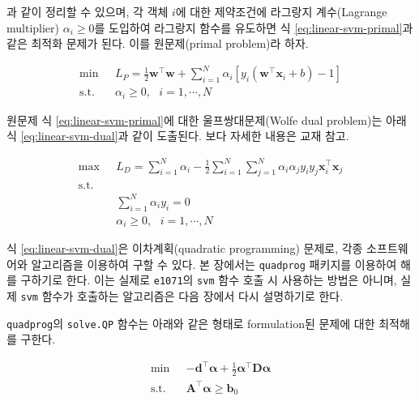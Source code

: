 \documentclass[
]{book}
\begin{document}
과 같이 정리할 수 있으며, 각 객체 \(i\)에 대한 제약조건에 라그랑지 계수(Lagrange multiplier) \(\alpha_i \ge 0\)를 도입하여 라그랑지 함수를 유도하면 식 \eqref{eq:linear-svm-primal}과 같은 최적화 문제가 된다. 이를 원문제(primal problem)라 하자.

\begin{equation}
\begin{split}
\min \text{  } & L_P = \frac{1}{2} \mathbf{w}^\top \mathbf{w} + \sum_{i = 1}^{N} \alpha_i \left[ y_i \left( \mathbf{w}^\top \mathbf{x}_i + b \right) - 1 \right]\\
\text{s.t.  } & \alpha_i \ge 0, \text{  } i = 1, \cdots, N
\end{split}
\label{eq:linear-svm-primal}
\end{equation}

원문제 식 \eqref{eq:linear-svm-primal}에 대한 울프쌍대문제(Wolfe dual problem)는 아래 식 \eqref{eq:linear-svm-dual}과 같이 도출된다. 보다 자세한 내용은 교재\citep{jun2012datamining} 참고.

\begin{equation}
\begin{split}
\max \text{  } & L_D = \sum_{i = 1}^{N} \alpha_i - \frac{1}{2} \sum_{i = 1}^{N} \sum_{j = 1}^{N} \alpha_i \alpha_j y_i y_j \mathbf{x}_i^\top \mathbf{x}_j\\
\text{s.t. } &\\
& \sum_{i = 1}^{N} \alpha_i y_i = 0\\
& \alpha_i \ge 0, \text{  } i = 1, \cdots, N
\end{split}
\label{eq:linear-svm-dual}
\end{equation}

식 \eqref{eq:linear-svm-dual}은 이차계획(quadratic programming) 문제로, 각종 소프트웨어와 알고리즘을 이용하여 구할 수 있다. 본 장에서는 \texttt{quadprog} 패키지를 이용하여 해를 구하기로 한다. 이는 실제로 \texttt{e1071}의 \texttt{svm} 함수 호출 시 사용하는 방법은 아니며, 실제 \texttt{svm} 함수가 호출하는 알고리즘은 다음 장에서 다시 설명하기로 한다.

\texttt{quadprog}의 \texttt{solve.QP} 함수는 아래와 같은 형태로 formulation된 문제\citep{goldfarb1983numerically}에 대한 최적해를 구한다.

\begin{equation}
\begin{split}
\min \text{  } & -\mathbf{d}^{\top}\boldsymbol{\alpha} + \frac{1}{2} \boldsymbol{\alpha}^{\top}\mathbf{D}\boldsymbol{\alpha}\\
\text{s.t. } & \mathbf{A}^{\top}\boldsymbol{\alpha} \ge \mathbf{b}_0
\end{split}
\label{eq:quadprog}
\end{equation}
\end{document}
